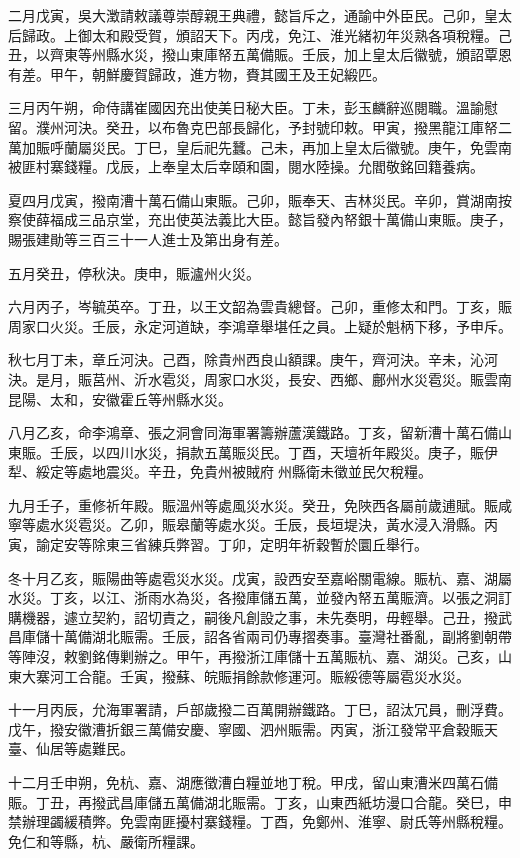 \begin{pinyinscope}
二月戊寅，吳大澂請敕議尊崇醇親王典禮，懿旨斥之，通諭中外臣民。己卯，皇太后歸政。上御太和殿受賀，頒詔天下。丙戌，免江、淮光緒初年災熟各項稅糧。己丑，以齊東等州縣水災，撥山東庫帑五萬備賑。壬辰，加上皇太后徽號，頒詔覃恩有差。甲午，朝鮮慶賀歸政，進方物，賚其國王及王妃緞匹。

三月丙午朔，命侍講崔國因充出使美日秘大臣。丁未，彭玉麟辭巡閱職。溫諭慰留。濮州河決。癸丑，以布魯克巴部長歸化，予封號印敕。甲寅，撥黑龍江庫帑二萬加賑呼蘭屬災民。丁巳，皇后祀先蠶。己未，再加上皇太后徽號。庚午，免雲南被匪村寨錢糧。戊辰，上奉皇太后幸頤和園，閱水陸操。允閻敬銘回籍養病。

夏四月戊寅，撥南漕十萬石備山東賑。己卯，賑奉天、吉林災民。辛卯，賞湖南按察使薛福成三品京堂，充出使英法義比大臣。懿旨發內帑銀十萬備山東賑。庚子，賜張建勛等三百三十一人進士及第出身有差。

五月癸丑，停秋決。庚申，賑瀘州火災。

六月丙子，岑毓英卒。丁丑，以王文韶為雲貴總督。己卯，重修太和門。丁亥，賑周家口火災。壬辰，永定河道缺，李鴻章舉堪任之員。上疑於魁柄下移，予申斥。

秋七月丁未，章丘河決。己酉，除貴州西良山額課。庚午，齊河決。辛未，沁河決。是月，賑莒州、沂水雹災，周家口水災，長安、西鄉、鄜州水災雹災。賑雲南昆陽、太和，安徽霍丘等州縣水災。

八月乙亥，命李鴻章、張之洞會同海軍署籌辦蘆漢鐵路。丁亥，留新漕十萬石備山東賑。壬辰，以四川水災，捐款五萬賑災民。丁酉，天壇祈年殿災。庚子，賑伊犁、綏定等處地震災。辛丑，免貴州被賊府州縣衛未徵並民欠稅糧。

九月壬子，重修祈年殿。賑溫州等處風災水災。癸丑，免陜西各屬前歲逋賦。賑咸寧等處水災雹災。乙卯，賑皋蘭等處水災。壬辰，長垣堤決，黃水浸入滑縣。丙寅，諭定安等除東三省練兵弊習。丁卯，定明年祈穀暫於圜丘舉行。

冬十月乙亥，賑陽曲等處雹災水災。戊寅，設西安至嘉峪關電線。賑杭、嘉、湖屬水災。丁亥，以江、浙雨水為災，各撥庫儲五萬，並發內帑五萬賑濟。以張之洞訂購機器，遽立契約，詔切責之，嗣後凡創設之事，未先奏明，毋輕舉。己丑，撥武昌庫儲十萬備湖北賑需。壬辰，詔各省兩司仍專摺奏事。臺灣社番亂，副將劉朝帶等陣沒，敕劉銘傳剿辦之。甲午，再撥浙江庫儲十五萬賑杭、嘉、湖災。己亥，山東大寨河工合龍。壬寅，撥蘇、皖賑捐餘款修運河。賑綏德等屬雹災水災。

十一月丙辰，允海軍署請，戶部歲撥二百萬開辦鐵路。丁巳，詔汰冗員，刪浮費。戊午，撥安徽漕折銀三萬備安慶、寧國、泗州賑需。丙寅，浙江發常平倉穀賑天臺、仙居等處難民。

十二月壬申朔，免杭、嘉、湖應徵漕白糧並地丁稅。甲戌，留山東漕米四萬石備賑。丁丑，再撥武昌庫儲五萬備湖北賑需。丁亥，山東西紙坊漫口合龍。癸巳，申禁辦理蠲緩積弊。免雲南匪擾村寨錢糧。丁酉，免鄭州、淮寧、尉氏等州縣稅糧。免仁和等縣，杭、嚴衛所糧課。


\end{pinyinscope}
